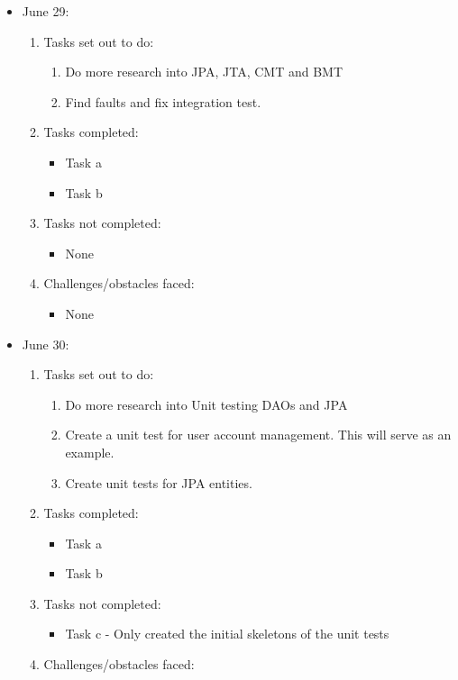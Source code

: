 	\begin{itemize}
	\item June 29:
	\begin{enumerate}
		\item Tasks set out to do:
		\begin{enumerate}
			\item Do more research into JPA, JTA, CMT and BMT
			\item Find faults and fix integration test. 				
		\end{enumerate}
		\item Tasks completed:
		\begin{itemize}
			\item Task a
			\item Task b								
		\end{itemize}
		\item Tasks not completed:
		\begin{itemize}
			\item None
		\end{itemize}
		\item Challenges/obstacles faced:
		\begin{itemize}
			\item None
		\end{itemize}			
	\end{enumerate}
	\item June 30:
	\begin{enumerate}
		\item Tasks set out to do:
		\begin{enumerate}
			\item Do more research into Unit testing DAOs and JPA
			\item Create a unit test for user account management. This will serve as an example.
			\item Create unit tests for JPA entities.				
		\end{enumerate}
		\item Tasks completed:
		\begin{itemize}
			\item Task a
			\item Task b								
		\end{itemize}
		\item Tasks not completed:
		\begin{itemize}
			\item Task c - Only created the initial skeletons of the unit tests
		\end{itemize}
		\item Challenges/obstacles faced:

\end{enumerate}
\end{itemize}
